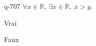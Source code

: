 \begin{truefalse}{q-707}
$\forall x \in \mathbb R,\:\exists x \in \mathbb R,\: x>y$.
\item Vrai
\item* Faux
\end{truefalse}

